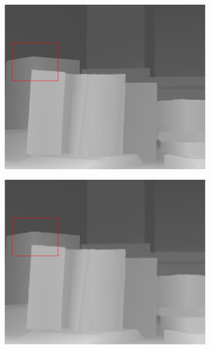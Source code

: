 \documentclass[preprint,10pt,5p,times,twocolumn]{elsarticle}
\begin{document}
\begin{figure}[t]
\begin{center}
\begin{subfigure}[b]{0.136\linewidth}
    \includegraphics[width=\linewidth]{cmp_book_8X_ST.png}
    \label{fig:}
\end{subfigure}
\begin{subfigure}[b]{0.136\linewidth}
    \includegraphics[width=\linewidth]{cmp_book_8X_LF.png}
    \label{fig:} %
\end{subfigure}
\begin{subfigure}[b]{0.136\linewidth}

\end{subfigure}
\end{center}
\end{figure}
\end{document}
